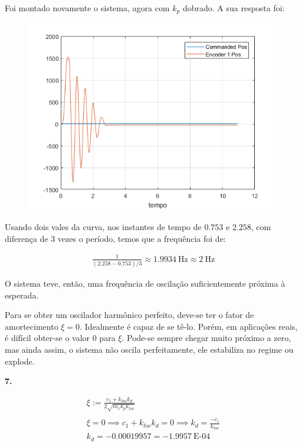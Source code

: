 \documentclass[a4paper,11pt]{article}
\begin{document}
Foi montado novamente o sistema, agora com $k_p$ dobrado. A sua resposta foi:

\begin{figure}[H]
\includegraphics{q06}
\centering
\end{figure}

Usando dois vales da curva, nos instantes de tempo de $0.753$ e $2.258$,
com diferença de 3 vezes o período, temos que a frequência foi de:

\begin{gather*}
    \frac{1}{\left(2.258 - 0.753\right)/3} \approx 1.9934~\text{Hz}
        \approx 2~\text{Hz}
\end{gather*}

O sistema teve, então, uma frequência de oscilação suficientemente próxima à
esperada.

Para se obter um oscilador harmônico perfeito, deve-se ter o fator de
amortecimento $\xi = 0$. Idealmente é capaz de se tê-lo. Porém, em aplicações
reais, é difícil obter-se o valor 0 para $\xi$. Pode-se sempre chegar muito
próximo a zero, mas ainda assim, o sistema não oscila perfeitamente, ele
estabiliza no regime ou explode.

\pagebreak

\textbf{7.}

\begin{gather*}
    \xi := \frac{c_1 + k_{hw} k_d}{2 \sqrt{m_1 k_p k_{hw}}} \\ \\
    \xi = 0 \implies c_1 + k_{hw} k_d = 0 \implies k_d = \frac{-c_1}{k_{hw}} \\
    k_d = -0.00019957 = -1.9957~\text{E-04}
\end{gather*}
\end{document}
